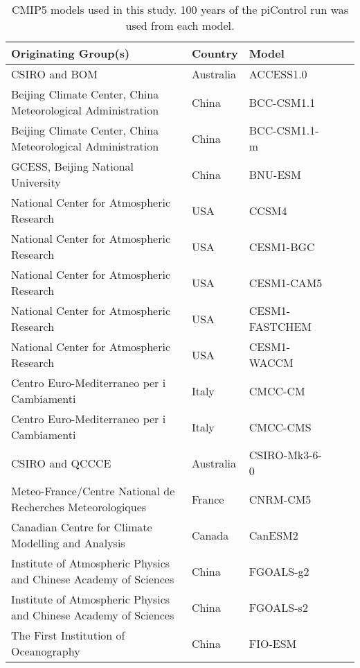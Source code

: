 \begin{center}
	\begin{table}[h]
	\caption{CMIP5 models used in this study. 100 years of the piControl run was 
	used from each model.}
		\label{tab:cmip5}
		\tiny
	\begin{tabular}{ l  l  l  l l}
		Originating Group(s) & Country & Model \\ \hline
		CSIRO and BOM & Australia & ACCESS1.0 \\
Beijing Climate Center, China Meteorological Administration & China & BCC-CSM1.1 
		 \\
Beijing Climate Center, China Meteorological Administration & China & 
		BCC-CSM1.1-m \\
		GCESS, Beijing National University & China & BNU-ESM \\
National Center for Atmospheric Research & USA & CCSM4 \\
		National Center for Atmospheric Research  & USA & CESM1-BGC  \\
		National Center for Atmospheric Research  & USA & CESM1-CAM5  \\
		National Center for Atmospheric Research  & USA & CESM1-FASTCHEM \\
		National Center for Atmospheric Research  & USA & CESM1-WACCM  \\
		Centro Euro-Mediterraneo per i Cambiamenti & Italy & CMCC-CM \\
		Centro Euro-Mediterraneo per i Cambiamenti & Italy & CMCC-CMS \\
		CSIRO and QCCCE & Australia & CSIRO-Mk3-6-0 \\
Meteo-France/Centre National de Recherches Meteorologiques & France & CNRM-CM5 
		\\
Canadian Centre for Climate Modelling and Analysis & Canada & CanESM2 \\
		Institute of Atmospheric Physics and Chinese Academy of Sciences & China & 
		FGOALS-g2 \\
		Institute of Atmospheric Physics and Chinese Academy of Sciences & China & 
		FGOALS-s2 \\
		The First Institution of Oceanography & China & FIO-ESM \\


\end{tabular}
\end{table}
\end{center}
